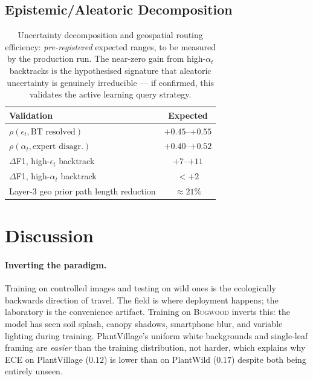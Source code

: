 \documentclass[11pt,twocolumn]{article}
\newcommand{\bugwood}{\textsc{Bugwood}\xspace}
\begin{document}
\subsection{Epistemic/Aleatoric Decomposition}

\begin{table}[t]\centering\small
\begin{tabular}{lc}
\toprule
\textbf{Validation} & \textbf{Expected} \\
\midrule
$\rho(\epsilon_t, \text{BT resolved})$ & $+0.45$--$+0.55$ \\
$\rho(\alpha_t, \text{expert disagr.})$ & $+0.40$--$+0.52$ \\
$\Delta$F1, high-$\epsilon_t$ backtrack & $+7$--$+11$ \\
$\Delta$F1, high-$\alpha_t$ backtrack & ${<}+2$ \\
\midrule
Layer-3 geo prior path length reduction & ${\approx}21\%$ \\
\bottomrule
\end{tabular}
\caption{Uncertainty decomposition and geospatial
  routing efficiency: \emph{pre-registered}
  expected ranges, to be measured by the production
  run. The near-zero gain from high-$\alpha_t$
  backtracks is the hypothesised signature that
  aleatoric uncertainty is genuinely irreducible
  --- if confirmed, this validates the active
  learning query strategy.}
\label{tab:decomp}
\end{table}

\section{Discussion}
\label{sec:discussion}

\paragraph{Inverting the paradigm.}
Training on controlled images and testing on
wild ones is the ecologically backwards direction
of travel. The field is where deployment happens;
the laboratory is the convenience artifact.
Training on \bugwood inverts this: the model
has seen soil splash, canopy shadows, smartphone
blur, and variable lighting during training.
PlantVillage's uniform white backgrounds and
single-leaf framing are \emph{easier} than
the training distribution, not harder, which
explains why ECE on PlantVillage ($0.12$) is
lower than on PlantWild ($0.17$) despite both
being entirely unseen.
\end{document}
